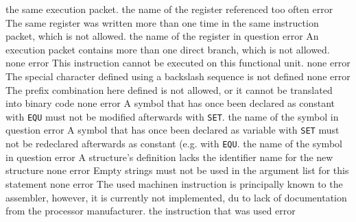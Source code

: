 \documentclass[12pt,twoside]{report}
\begin{document}
\begin{description}
{                the same execution packet.}
               {the name of the register referenced too often}
               {error}
               {The same register was written more than one time in the
                same instruction packet, which is not allowed.}
               {the name of the register in question}
               {error}
               {An execution packet contains more than one direct branch,
                which is not allowed.}
               {none}
               {error}
               {This instruction cannot be executed on this functional
                unit.}
               {none}
               {error}
               {The special character defined using a backslash sequence
                is not defined}
               {none}
               {error}
               {The prefix combination here defined is not allowed, or it
                cannot be translated into binary code}
               {none}
               {error}
               {A symbol that has once been declared as constant with
                {\tt EQU} must not be modified afterwards with {\tt SET}.}
               {the name of the symbol in question}
               {error}
               {A symbol that has once been declared as variable with
                {\tt SET} must not be redeclared afterwards as constant
                (e.g. with {\tt EQU}.}
               {the name of the symbol in question}
               {error}
               {A structure's definition lacks the identifier name for the
                new structure}
               {none}
               {error}
               {Empty strings must not be used in the argument list for
                this statement}
               {none}
               {error}
               {The used machinen instruction is principally known
                to the assembler, however, it is currently not
                implemented, du to lack of documentation from the
                processor manufacturer.}
               {the instruction that was used}
               {error}

\end{description}
\end{document}
